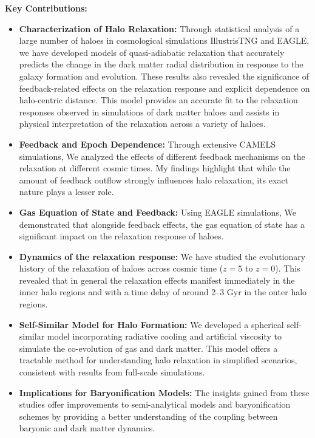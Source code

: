 \documentclass[11pt]{article}
\begin{document}
\textbf{Key Contributions:}
\begin{itemize}
    \item \textbf{Characterization of Halo Relaxation:} Through statistical analysis of a large number of haloes in cosmological simulations IllustrisTNG and EAGLE, we have developed models of quasi-adiabatic relaxation that accurately predicts the change in the dark matter radial distribution in response to the galaxy formation and evolution. These results also revealed the significance of feedback-related effects on the relaxation response and explicit dependence on halo-centric distance. This model provides an accurate fit to the relaxation responses observed in simulations of dark matter haloes and assists in physical interpretation of the relaxation across a variety of haloes.
    
    \item \textbf{Feedback and Epoch Dependence:} Through extensive CAMELS simulations, We analyzed the effects of different feedback mechanisms on the relaxation at different cosmic times. My findings highlight that while the amount of feedback outflow strongly influences halo relaxation, its exact nature plays a lesser role.
    
    \item \textbf{Gas Equation of State and Feedback:} Using EAGLE simulations, We demonstrated that alongside feedback effects, the gas equation of state has a significant impact on the relaxation response of haloes. 

    \item \textbf{Dynamics of the relaxation response:}  We have studied the evolutionary history of the relaxation of haloes across cosmic time ($z=5$ to $z=0$). This revealed that in general the relaxation effects manifest immediately in the inner halo regions and with a time delay of around 2–3 Gyr in the outer halo regions.
    
    \item \textbf{Self-Similar Model for Halo Formation:} We developed a spherical self-similar model incorporating radiative cooling and artificial viscosity to simulate the co-evolution of gas and dark matter. This model offers a tractable method for understanding halo relaxation in simplified scenarios, consistent with results from full-scale simulations.
    
    \item \textbf{Implications for Baryonification Models:} The insights gained from these studies offer improvements to semi-analytical models and baryonification schemes by providing a better understanding of the coupling between baryonic and dark matter dynamics.
\end{itemize}
\end{document}
